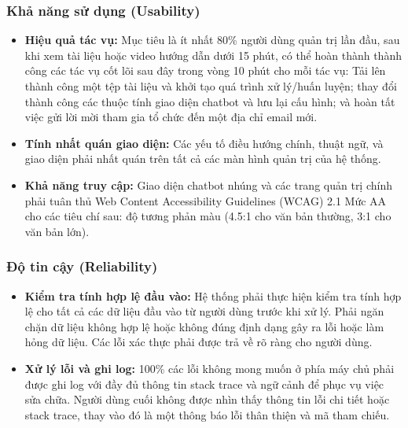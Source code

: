 \subsubsection{Khả năng sử dụng (Usability)}
\begin{itemize}
    \item \textbf{Hiệu quả tác vụ:} Mục tiêu là ít nhất 80\% người dùng quản trị lần đầu, sau khi xem tài liệu hoặc video hướng dẫn dưới 15 phút, có thể hoàn thành thành công các tác vụ cốt lõi sau đây trong vòng 10 phút cho mỗi tác vụ: Tải lên thành công một tệp tài liệu và khởi tạo quá trình xử lý/huấn luyện; thay đổi thành công các thuộc tính giao diện chatbot và lưu lại cấu hình; và hoàn tất việc gửi lời mời tham gia tổ chức đến một địa chỉ email mới.
    \item \textbf{Tính nhất quán giao diện:} Các yếu tố điều hướng chính, thuật ngữ, và giao diện phải nhất quán trên tất cả các màn hình quản trị của hệ thống.
    \item \textbf{Khả năng truy cập:} Giao diện chatbot nhúng và các trang quản trị chính phải tuân thủ Web Content Accessibility Guidelines (WCAG) 2.1 Mức AA cho các tiêu chí sau: độ tương phản màu (4.5:1 cho văn bản thường, 3:1 cho văn bản lớn).
\end{itemize}

\subsubsection{Độ tin cậy (Reliability)}
\begin{itemize}
    \item \textbf{Kiểm tra tính hợp lệ đầu vào:} Hệ thống phải thực hiện kiểm tra tính hợp lệ cho tất cả các dữ liệu đầu vào từ người dùng trước khi xử lý. Phải ngăn chặn dữ liệu không hợp lệ hoặc không đúng định dạng gây ra lỗi hoặc làm hỏng dữ liệu. Các lỗi xác thực phải được trả về rõ ràng cho người dùng.
    \item \textbf{Xử lý lỗi và ghi log:} 100\% các lỗi không mong muốn ở phía máy chủ phải được ghi log với đầy đủ thông tin stack trace và ngữ cảnh để phục vụ việc sửa chữa. Người dùng cuối không được nhìn thấy thông tin lỗi chi tiết hoặc stack trace, thay vào đó là một thông báo lỗi thân thiện và mã tham chiếu.
\end{itemize}

